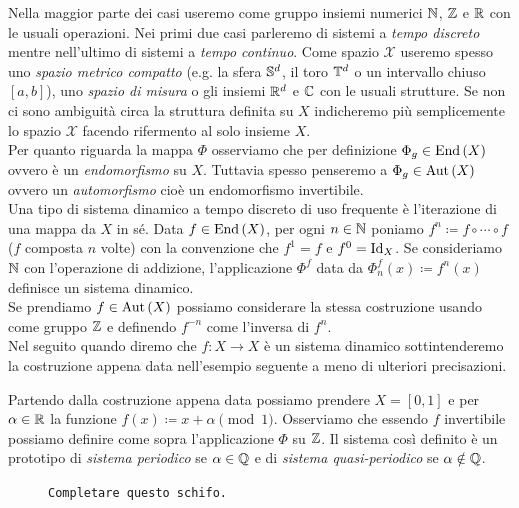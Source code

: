 Nella maggior parte dei casi useremo come gruppo insiemi numerici $ \N $, $ \Z $ e $ \R $ con le usuali operazioni. Nei primi due casi parleremo di sistemi a \emph{tempo discreto} mentre nell'ultimo di sistemi a \emph{tempo continuo}. Come spazio $ \mathcal{X} $ useremo spesso uno \emph{spazio metrico compatto} (e.g. la sfera $ \S^d $, il toro $ \T^d $ o un intervallo chiuso $ [a, b] $), uno \emph{spazio di misura} o gli insiemi $ \R^d $ e $ \C $ con le usuali strutture. Se non ci sono ambiguità circa la struttura definita su $ X $ indicheremo più semplicemente lo spazio $ \mathcal{X} $ facendo rifermento al solo insieme $ X $. \\

Per quanto riguarda la mappa $ \Phi $ osserviamo che per definizione $ \Phi_g \in \End{(X)} $ ovvero è un \emph{endomorfismo} su $ X $. Tuttavia spesso penseremo a $ \Phi_g \in \Aut{(X)} $ ovvero un \emph{automorfismo} cioè un endomorfismo invertibile. \\

Una tipo di sistema dinamico a tempo discreto di uso frequente è l'iterazione di una mappa da $ X $ in sé. Data $ f \in \End{(X)} $, per ogni $ n \in \N $ poniamo $ f^n \coloneqq f \circ \cdots \circ f $ ($ f $ composta $ n $ volte) con la convenzione che $ f^1 = f $ e $ f^0 = \Id_X $. Se consideriamo $ \N $ con l'operazione di addizione, l'applicazione $ \Phi^f $ data da $ \Phi_n^f(x) \coloneqq f^n(x) $ definisce un sistema dinamico. \\
Se prendiamo $ f \in \Aut{(X)} $ possiamo considerare la stessa costruzione usando come gruppo $ \Z $ e definendo $ f^{-n} $ come l'inversa di $ f^n $. \\
Nel seguito quando diremo che $ f \colon X \to X $ è un sistema dinamico sottintenderemo la costruzione appena data nell'esempio seguente a meno di ulteriori precisazioni. 


\begin{example}
	Partendo dalla costruzione appena data possiamo prendere $ X = [0, 1] $ e per $ \alpha \in \R $ la funzione $ f(x) \coloneqq x + \alpha \pmod{1} $. Osserviamo che essendo $ f $ invertibile possiamo definire come sopra l'applicazione $ \Phi $ su $ \Z $. Il sistema così definito è un prototipo di \emph{sistema periodico} se $ \alpha \in \Q $ e di \emph{sistema quasi-periodico} se $ \alpha \notin \Q $. 
	\iffigureon
	\begin{figure}[h!]
		\centering
		
		\caption{\texttt{Completare questo schifo.}}
	\end{figure}
	\fi
\end{example}


